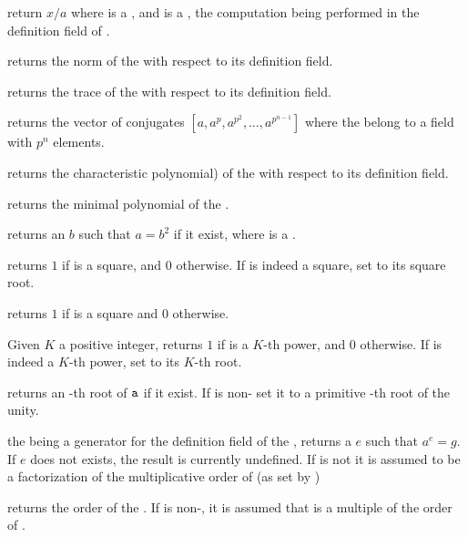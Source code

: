  return $x/a$ where  is a
, and  is a , the computation being
performed in the definition field of .

 returns the norm of the   with
respect to its definition field.

 returns the trace of the   with
respect to its definition field.

 returns the vector of conjugates
$[a,a^p,a^{p^2},\ldots,a^{p^{n-1}}]$ where the   belong to a
field with $p^n$ elements.

 returns the characteristic polynomial) of the
  with respect to its definition field.

 returns the minimal polynomial of
the  .

 returns an  $b$ such that $a=b^2$ if
it exist, where  is a .

 returns $1$ if  is a
square, and $0$ otherwise. If  is indeed a square, set  to its
square root.

 returns $1$ if  is a square and $0$
otherwise.

 Given $K$ a positive integer,
returns $1$ if  is a $K$-th power, and $0$ otherwise. If  is
indeed a $K$-th power, set  to its $K$-th root.

 returns an -th root of
${\tt a}$ if it exist. If  is non- set it to a primitive
-th root of the unity.

 the   being a
generator for the definition field of the  , returns a
 $e$ such that $a^e=g$.  If $e$ does not exists, the result is
currently undefined. If  is not  it is assumed to be a
factorization of the multiplicative order of  (as set by
)

 returns the order of the  .
If  is non-, it is assumed that  is a multiple of the
order of .

